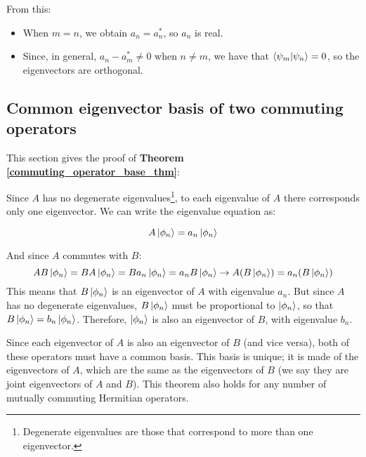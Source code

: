 From this:
\begin{itemize}
    \item When $m = n$, we obtain $a_n = a_n^*$, so $a_n$ is real.
    \item Since, in general, $a_n - a_m^* \neq 0$ when $n \neq m$, we have that $\braket{\psi_m|\psi_n} = 0$, so the eigenvectors are orthogonal.
\end{itemize}

\subsection{Common eigenvector basis of two commuting operators} \label{commuting_operator_basis}

This section gives the proof of \textbf{Theorem \ref{commuting_operator_base_thm}}:

Since $A$ has no degenerate eigenvalues\footnote{Degenerate eigenvalues are those that correspond to more than one eigenvector.}, to each eigenvalue of $A$ there corresponds only one eigenvector. We can write the eigenvalue equation as:

\begin{equation}
    A\ket{\phi_n} = a_n\ket{\phi_n}
\end{equation}

And since $A$ commutes with $B$:
\begin{equation}
    AB\ket{\phi_n} = BA\ket{\phi_n} = Ba_n\ket{\phi_n} = a_nB\ket{\phi_n}\to A (B\ket{\phi_n}) = a_n(B\ket{\phi_n})
\end{equation}
This means that $B\ket{\phi_n}$ is an eigenvector of $A$ with eigenvalue $a_n$. But since $A$ has no degenerate eigenvalues, $B\ket{\phi_n}$ must be proportional to $\ket{\phi_n}$, so that $B\ket{\phi_n} = b_n\ket{\phi_n}$. Therefore, $\ket{\phi_n}$ is also an eigenvector of $B$, with eigenvalue $b_n$.

Since each eigenvector of $A$ is also an eigenvector of $B$ (and vice versa), both of these operators must have a common basis. This basis is unique; it is made of the eigenvectors of $A$, which are the same as the eigenvectors of $B$ (we say they are joint eigenvectors of $A$ and $B$). This theorem also holds for any number of mutually commuting Hermitian operators.